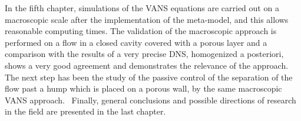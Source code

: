 In the fifth chapter, simulations of the VANS equations are carried out on a macroscopic scale after the implementation of the meta-model, and this allows reasonable computing times. The validation of the macroscopic approach is performed on a flow in a closed cavity covered with a porous layer and a comparison with the results of a very precise DNS, homogenized a posteriori, shows a very good agreement and demonstrates the relevance of the approach. The next step has been the study of the passive control of the separation of the flow past a hump which is placed on a  porous wall, by the same macroscopic VANS approach.  Finally, general conclusions and possible directions of research in the field are presented in the last chapter.